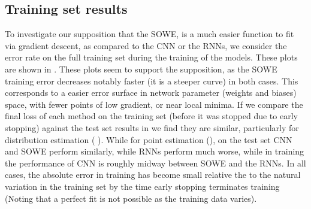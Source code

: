 \documentclass[11pt,a4paper]{article}
\begin{document}
\subsection{Training set results}

To investigate our supposition that the SOWE, is a much easier function to fit via gradient descent, as compared to the CNN or the RNNs, we consider the error rate on the full training set during the training of the models.
These plots are shown in .
These plots seem to support the supposition, as the SOWE training error decreases notably faster (it is a steeper curve) in both cases.
This corresponds to a easier error surface in network parameter (weights and biases) space, with fewer points of low gradient, or near local minima.
If we compare the final loss of each method on the training set (before it was stopped due to early stopping) against the test set results in  
we find they are similar,  particularly for distribution estimation ( ).
While for point estimation (), on the test set CNN and SOWE perform similarly, while RNNs perform much worse, while in training the performance of CNN is roughly midway between SOWE and the RNNs.
In all cases, the absolute error in training has become small relative the to the natural variation in the training set by the time early stopping terminates training (Noting that a perfect fit is not possible as the training data varies).




\end{document}
